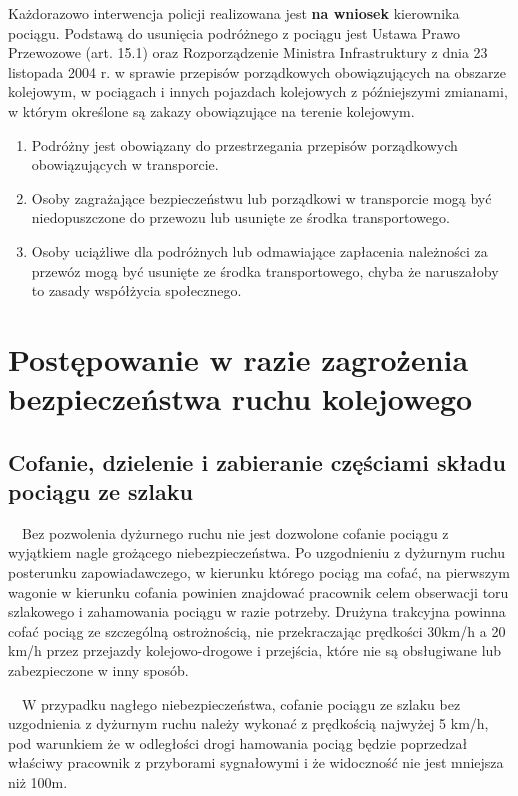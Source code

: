 Każdorazowo interwencja policji realizowana jest \textbf{na wniosek} kierownika pociągu. Podstawą do usunięcia podróżnego z pociągu jest Ustawa Prawo Przewozowe (art. 15.1) oraz Rozporządzenie Ministra Infrastruktury z dnia 23 listopada 2004 r. w sprawie przepisów porządkowych obowiązujących na obszarze kolejowym, w pociągach i innych pojazdach kolejowych z późniejszymi zmianami, w którym określone są zakazy obowiązujące na terenie kolejowym. 
\begin{tcolorbox}[colback=teal!5!white,colframe=red!45!black,width=0.45\textwidth,title=Art. 15. ustawy Prawo Przewozowe]
	
	\begin{enumerate}
		\item Podróżny jest obowiązany do przestrzegania przepisów
		porządkowych obowiązujących w transporcie.
		\item Osoby zagrażające bezpieczeństwu lub porządkowi w transporcie mogą być
		niedopuszczone do przewozu lub usunięte ze środka transportowego.
		\item Osoby uciążliwe dla podróżnych lub odmawiające zapłacenia należności za
		przewóz mogą być usunięte ze środka transportowego, chyba że naruszałoby to zasady współżycia społecznego.
	\end{enumerate}	
\end{tcolorbox}

\chapter{Postępowanie w razie zagrożenia bezpieczeństwa ruchu kolejowego}

\section{Cofanie, dzielenie i zabieranie częściami składu pociągu ze szlaku}

\ \ Bez pozwolenia dyżurnego ruchu nie jest dozwolone cofanie pociągu z wyjątkiem nagle grożącego niebezpieczeństwa. Po
uzgodnieniu z dyżurnym ruchu posterunku zapowiadawczego, w kierunku którego pociąg ma cofać, na pierwszym wagonie w
kierunku cofania powinien znajdować pracownik celem obserwacji toru szlakowego i zahamowania pociągu w razie potrzeby.
Drużyna trakcyjna powinna cofać pociąg ze szczególną ostrożnością, nie przekraczając prędkości 30km/h a 20 km/h przez
przejazdy kolejowo-drogowe i przejścia, które nie są obsługiwane lub zabezpieczone w inny sposób.

\ \ W przypadku nagłego niebezpieczeństwa, cofanie pociągu ze szlaku bez uzgodnienia z dyżurnym ruchu należy wykonać z
prędkością najwyżej 5 km/h, pod warunkiem że w odległości drogi hamowania pociąg będzie poprzedzał właściwy pracownik z
przyborami sygnałowymi i że widoczność nie jest mniejsza niż 100m.

